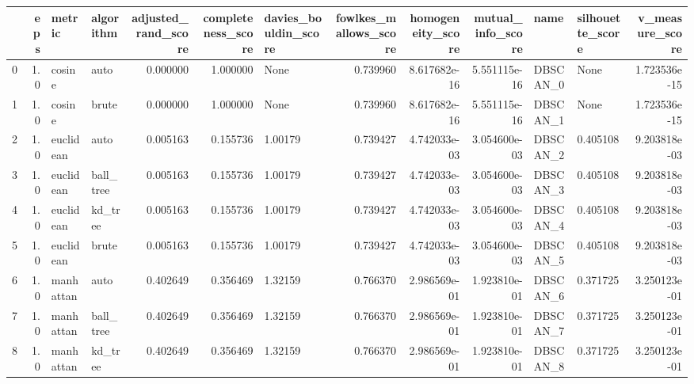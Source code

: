 \begin{tabular}{lrllrrlrrrllr}
\toprule
{} &  eps &     metric &  algorithm &  adjusted\_rand\_score &  completeness\_score & davies\_bouldin\_score &  fowlkes\_mallows\_score &  homogeneity\_score &  mutual\_info\_score &       name & silhouette\_score &  v\_measure\_score \\
\midrule
0  &  1.0 &     cosine &       auto &             0.000000 &            1.000000 &                 None &               0.739960 &       8.617682e-16 &       5.551115e-16 &   DBSCAN\_0 &             None &     1.723536e-15 \\
1  &  1.0 &     cosine &      brute &             0.000000 &            1.000000 &                 None &               0.739960 &       8.617682e-16 &       5.551115e-16 &   DBSCAN\_1 &             None &     1.723536e-15 \\
2  &  1.0 &  euclidean &       auto &             0.005163 &            0.155736 &              1.00179 &               0.739427 &       4.742033e-03 &       3.054600e-03 &   DBSCAN\_2 &         0.405108 &     9.203818e-03 \\
3  &  1.0 &  euclidean &  ball\_tree &             0.005163 &            0.155736 &              1.00179 &               0.739427 &       4.742033e-03 &       3.054600e-03 &   DBSCAN\_3 &         0.405108 &     9.203818e-03 \\
4  &  1.0 &  euclidean &    kd\_tree &             0.005163 &            0.155736 &              1.00179 &               0.739427 &       4.742033e-03 &       3.054600e-03 &   DBSCAN\_4 &         0.405108 &     9.203818e-03 \\
5  &  1.0 &  euclidean &      brute &             0.005163 &            0.155736 &              1.00179 &               0.739427 &       4.742033e-03 &       3.054600e-03 &   DBSCAN\_5 &         0.405108 &     9.203818e-03 \\
6  &  1.0 &  manhattan &       auto &             0.402649 &            0.356469 &              1.32159 &               0.766370 &       2.986569e-01 &       1.923810e-01 &   DBSCAN\_6 &         0.371725 &     3.250123e-01 \\
7  &  1.0 &  manhattan &  ball\_tree &             0.402649 &            0.356469 &              1.32159 &               0.766370 &       2.986569e-01 &       1.923810e-01 &   DBSCAN\_7 &         0.371725 &     3.250123e-01 \\
8  &  1.0 &  manhattan &    kd\_tree &             0.402649 &            0.356469 &              1.32159 &               0.766370 &       2.986569e-01 &       1.923810e-01 &   DBSCAN\_8 &         0.371725 &     3.250123e-01 \\

\end{tabular}
